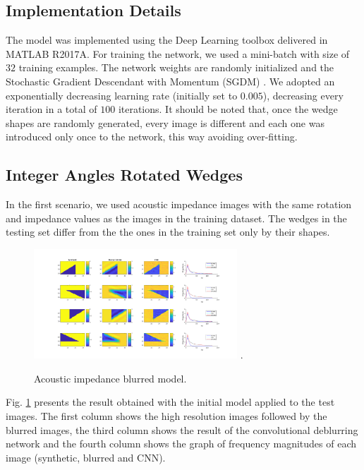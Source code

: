 \documentclass[conference,compsoc]{IEEEtran}
\begin{document}

\subsection{Implementation Details}
The model was implemented using the Deep Learning toolbox
delivered in MATLAB R2017A. For training the network, we used a mini-batch with size of $32$ training examples.
The network weights are randomly initialized and the Stochastic Gradient Descendant with
Momentum (SGDM) \cite{Ning}. We adopted an exponentially decreasing learning rate (initially
set to $0.005$), decreasing every iteration in a total of $100$ iterations.
It should be noted that, once the wedge shapes are randomly generated, every image is different
and each one was introduced only once to the network, this way avoiding over-fitting.

\subsection{Integer Angles Rotated Wedges}

In the first scenario, we used acoustic impedance images
with the same rotation and impedance values as the images in the
training dataset. The wedges in the testing set differ from
the the ones in the training set only by their shapes.
\begin{figure}[!t]
\centering
\includegraphics[width=3.0in]{Figs/Caso1}
\DeclareGraphicsExtensions.
\caption{Acoustic impedance blurred model.}
\label{fig_scenario1}
\end{figure}
Fig. \ref{fig_scenario1} presents the result obtained with the initial model applied to the
test images. The first column shows the high resolution images followed
by the blurred images, the third column shows the result of the convolutional deblurring network
and the fourth column shows the graph of frequency magnitudes of each image
(synthetic, blurred and CNN).
\end{document}

